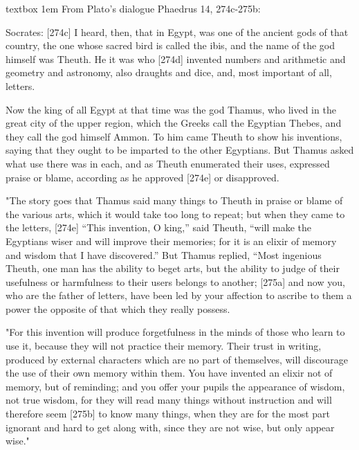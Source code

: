 \begin{table}[b]
\begin{scriptexample}{textbox}
\parindent1em
From Plato's dialogue Phaedrus 14, 274c-275b:

Socrates: [274c] I heard, then, that   in Egypt, was one of the ancient gods of that country, the one whose sacred bird is called the ibis, and the name of the god himself was Theuth. He it was who [274d] invented numbers and arithmetic and geometry and astronomy, also draughts and dice, and, most important of all, letters. 

Now the king of all Egypt at that time was the god Thamus, who lived in the great city of the upper region, which the Greeks call the Egyptian Thebes, and they call the god himself Ammon. To him came Theuth to show his inventions, saying that they ought to be imparted to the other Egyptians. But Thamus asked what use there was in each, and as Theuth enumerated their uses, expressed praise or blame, according as he approved [274e] or disapproved.  

"The story goes that Thamus said many things to Theuth in praise or blame of the various arts, which it would take too long to repeat; but when they came to the letters, [274e] “This invention, O king,” said Theuth, “will make the Egyptians wiser and will improve their memories; for it is an elixir of memory and wisdom that I have discovered.” But Thamus replied, “Most ingenious Theuth, one man has the ability to beget arts, but the ability to judge of their usefulness or harmfulness to their users belongs to another; [275a] and now you, who are the father of letters, have been led by your affection to ascribe to them a power the opposite of that which they really possess.  

"For this invention will produce forgetfulness in the minds of those who learn to use it, because they will not practice their memory. Their trust in writing, produced by external characters which are no part of themselves, will discourage the use of their own memory within them. You have invented an elixir not of memory, but of reminding; and you offer your pupils the appearance of wisdom, not true wisdom, for they will read many things without instruction and will therefore seem [275b] to know many things, when they are for the most part ignorant and hard to get along with, since they are not wise, but only appear wise." 
\end{scriptexample}
\end{table}





